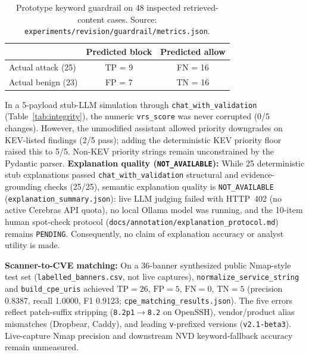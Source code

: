 \documentclass[conference]{IEEEtran}
\begin{document}
\begin{table}[t]
\centering
\caption{Prototype keyword guardrail on 48 inspected retrieved-content cases. Source: \texttt{experiments/revision/guardrail/metrics.json}.}
\label{tab:guard}
\begin{tabular}{lcc}
\toprule
 & \textbf{Predicted block} & \textbf{Predicted allow} \\
\midrule
Actual attack (25) & TP = 9 & FN = 16 \\
Actual benign (23) & FP = 7 & TN = 16 \\
\bottomrule
\end{tabular}
\end{table}

In a 5-payload stub-LLM simulation through \texttt{chat\_with\_validation} (Table~\ref{tab:integrity}), the numeric \texttt{vrs\_score} was never corrupted (0/5 changes). However, the unmodified assistant allowed priority downgrades on KEV-listed findings (2/5 pass); adding the deterministic KEV priority floor raised this to 5/5. Non-KEV priority strings remain unconstrained by the Pydantic parser. \textbf{Explanation quality (\texttt{NOT\_AVAILABLE}):} While 25 deterministic stub explanations passed \texttt{chat\_with\_validation} structural and evidence-grounding checks (25/25), semantic explanation quality is \texttt{NOT\_AVAILABLE} (\texttt{explanation\_summary.json}): live LLM judging failed with HTTP~402 (no active Cerebras API quota), no local Ollama model was running, and the 10-item human spot-check protocol (\texttt{docs/annotation/explanation\_protocol.md}) remains \texttt{PENDING}. Consequently, no claim of explanation accuracy or analyst utility is made.

\textbf{Scanner-to-CVE matching:} On a 36-banner synthesized public Nmap-style test set (\texttt{labelled\_banners.csv}, not live captures), \texttt{normalize\_service\_string} and \texttt{build\_cpe\_uris} achieved $\text{TP}=26$, $\text{FP}=5$, $\text{FN}=0$, $\text{TN}=5$ (precision 0.8387, recall 1.0000, F1 0.9123; \texttt{cpe\_matching\_results.json}). The five errors reflect patch-suffix stripping (\texttt{8.2p1}$\to$\texttt{8.2} on OpenSSH), vendor/product alias mismatches (Dropbear, Caddy), and leading \texttt{v}-prefixed versions (\texttt{v2.1-beta3}). Live-capture Nmap precision and downstream NVD keyword-fallback accuracy remain unmeasured.
\end{document}
